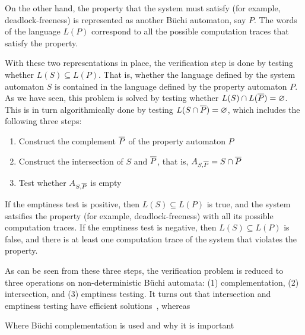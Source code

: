 On the other hand, the property that the system must satisfy (for example, deadlock-freeness) is represented as another Büchi automaton, say $P$. The words of the language $L(P)$ correspond to all the possible computation traces that satisfy the property.

With these two representations in place, the verification step is done by testing whether $L(S) \subseteq L(P)$. That is, whether the language defined by the system automaton $S$ is contained in the language defined by the property automaton $P$. As we have seen, this problem is solved by testing whether $L(S) \cap L(\cl1{P}) = \varnothing$. This is in turn algorithmically done by testing $L(S \cap \cl1{P}) = \varnothing$, which includes the following three steps:

\begin{enumerate}
\item Construct the complement $\cl1{P}$ of the property automaton $P$
\item Construct the intersection of $S$ and $\cl1{P}$, that is, $A_{S,\cl1{P}} = S \cap \cl1{P}$
\item Test whether $A_{S,\cl1{P}}$ is empty
\end{enumerate}

If the emptiness test is positive, then $L(S) \subseteq L(P)$ is true, and the system satsifies the property (for example, deadlock-freeness) with all its possible computation traces. If the emptiness test is negative, then $L(S) \subseteq L(P)$ is false, and there is at least one computation trace of the system that violates the property.

As can be seen from these three steps, the verification problem is reduced to three operations on non-deterministic Büchi automata: (1) complementation, (2) intersection, and (3) emptiness testing. It turns out that intersection and emptiness testing have efficient solutions~\cite{1996_vardi}, whereas 


Where Büchi complementation is used and why it is important


